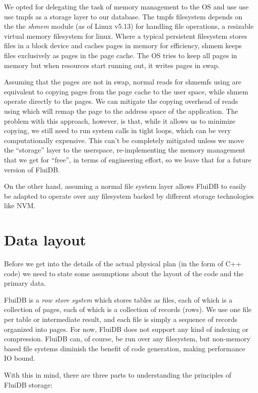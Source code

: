 We opted for delegating the task of memory management to the OS and
use use use tmpfs as a storage layer to our database. The tmpfs
filesystem depends on the the \emph{shmem} module (as of Linux v5.13)
for handling file operations, a resizable virtual memory filesystem
for linux. Where a typical persistent filesystem stores files in a
block device and caches pages in memory for efficiency, shmem keeps
files exclusively as pages in the page cache. The OS tries to keep all
pages in memory but when resources start running out, it writes pages
in swap.

Assuming that the pages are not in swap, normal reads for shmemfs
using  are equivalent to copying pages from the page cache
to the user space, while shmem  operate directly to the
pages. We can mitigate the copying overhead of reads using 
which will remap the page to the address space of the application.
The problem with this approach, however, is that, while it allows us
to minimize copying, we still need to run system calls in tight loops,
which can be very computationally expensive. This can't be completely
mitigated unless we move the ``storage'' layer to the userspace,
re-implementing the memory management that we get for ``free'', in
terms of engineering effort, so we leave that for a future version of
FluiDB.

On the other hand, assuming a normal file system layer allows FluiDB
to easily be adapted to operate over any filesystem backed by
different storage technologies like NVM.

\section{Data layout}

Before we get into the details of the actual physical plan (in the
form of C++ code) we need to state some assumptions about the layout
of the code and the primary data.

FluiDB is a \emph{row store system} which stores tables as files, each
of which is a collection of pages, each of which is a collection of
records (rows). We use one file per table or intermediate result, and
each file is simply a sequence of records organized into pages. For
now, FluiDB does not support any kind of indexing or
compression. FluiDB can, of course, be run over any filesystem, but
non-memory based file systems diminish the benefit of code generation,
making performance IO bound.

With this in mind, there are three parts to understanding the
principles of FluiDB storage:

